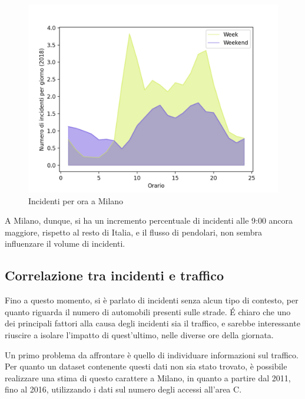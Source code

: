 \documentclass[a4paper]{report}
\begin{document}
\begin{figure}
    \includegraphics[width=\linewidth]{../src/incidenti/incidenti_senza_coords/ore_punta/week_weekend_milano.png}
    \caption{Incidenti per ora a Milano}
    \label{fig:week-weekend-milano}
\end{figure}

A Milano, dunque, si ha un incremento percentuale di incidenti alle 9:00 ancora maggiore,
rispetto al resto di Italia, e il flusso di pendolari, non sembra influenzare il volume di incidenti.

\subsection{Correlazione tra incidenti e traffico}

Fino a questo momento, si è parlato di incidenti senza alcun tipo di contesto, per quanto riguarda 
il numero di automobili presenti sulle strade. 
\'E chiaro che uno dei principali fattori alla causa degli incidenti sia il traffico, e sarebbe 
interessante riuscire a isolare l'impatto di quest'ultimo, nelle diverse ore della giornata.

Un primo problema da affrontare è quello di individuare informazioni sul traffico. 
Per quanto un dataset contenente questi dati non sia stato trovato, 
è possibile realizzare una stima di questo carattere a Milano, 
in quanto a partire dal 2011, fino al 2016, utilizzando i dati sul numero degli accessi all'area C.
\end{document}
